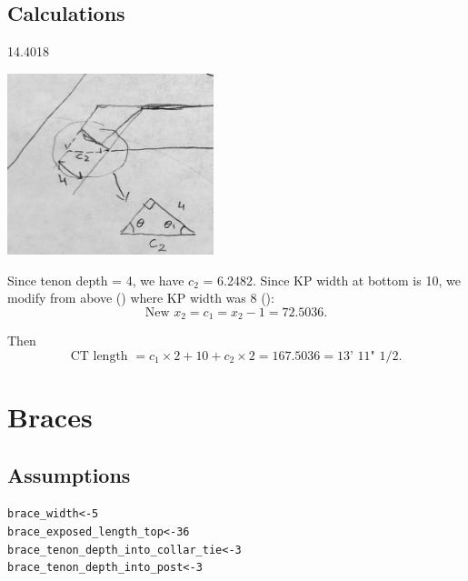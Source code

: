 \documentclass{article}\usepackage[]{graphicx}\usepackage[]{xcolor}
\makeatletter
\newcommand{\hlnum}[1]{\textcolor[rgb]{0.686,0.059,0.569}{#1}}%
\newcommand{\hlstd}[1]{\textcolor[rgb]{0.345,0.345,0.345}{#1}}%
\newcommand{\hlkwb}[1]{\textcolor[rgb]{0.69,0.353,0.396}{#1}}%
\newenvironment{kframe}{%
 \def\at@end@of@kframe{}%
 \ifinner\ifhmode%
  \def\at@end@of@kframe{\end{minipage}}%
  \begin{minipage}{\columnwidth}%
 \fi\fi%
 \def\FrameCommand##1{\hskip\@totalleftmargin \hskip-\fboxsep
 \colorbox{shadecolor}{##1}\hskip-\fboxsep
     \hskip-\linewidth \hskip-\@totalleftmargin \hskip\columnwidth}%
 \MakeFramed {\advance\hsize-\width
   \@totalleftmargin\z@ \linewidth\hsize
   \@setminipage}}%
 {\par\unskip\endMakeFramed%
 \at@end@of@kframe}
\newenvironment{knitrout}{}{} %
\makeatother
\begin{document}
\subsection{Calculations}



14.4018


\begin{center}\end{center}
\begin{center}
	\includegraphics[width=0.45\textwidth]{images/ct_cut_plan}
\end{center}

Since tenon depth = 4, we have $c_2$ = 6.2482. Since KP width at bottom is 10, we modify from above () where KP width was 8 ():
\[ \text{New }x_2 = c_1 = x_2 - 1 = 72.5036.  \]

Then 
\[ \boxed{\text{CT length }= c_1\times 2 + 10 + c_2\times 2 = 167.5036 = \text{13' 11" 1/2}.}\]

















\section{Braces} \label{braces}

\subsection{Assumptions}
\begin{knitrout}
\color{fgcolor}\begin{kframe}
\begin{alltt}
\hlstd{brace_width} \hlkwb{<-} \hlnum{5}
\hlstd{brace_exposed_length_top} \hlkwb{<-} \hlnum{36}
\hlstd{brace_tenon_depth_into_collar_tie} \hlkwb{<-} \hlnum{3}
\hlstd{brace_tenon_depth_into_post} \hlkwb{<-} \hlnum{3}
\end{alltt}
\end{kframe}
\end{knitrout}
\end{document}
